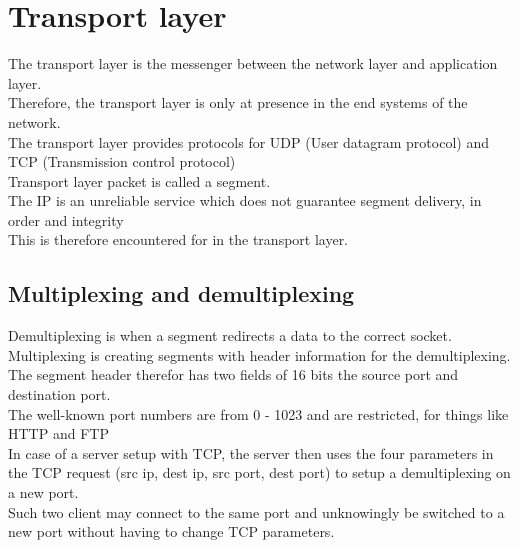 \documentclass[12pt, a4paper]{article}
\begin{document}
	\section{Transport layer}
		The transport layer is the messenger between the network layer and application layer.\\
		Therefore, the transport layer is only at presence in the end systems of the network.\\
		The transport layer provides protocols for UDP (User datagram protocol) and TCP (Transmission control protocol)\\
		Transport layer packet is called a segment.\\
		The IP is an unreliable service which does not guarantee segment delivery, in order and integrity\\
		This is therefore encountered for in the transport layer.\\
		\subsection{Multiplexing and demultiplexing}
			Demultiplexing is when a segment redirects a data to the correct socket.\\
			Multiplexing is creating segments with header information for the demultiplexing.\\
			The segment header therefor has two fields of 16 bits the source port and destination port.\\
			The well-known port numbers are from 0 - 1023 and are restricted, for things like HTTP and FTP\\
			In case of a server setup with TCP, the server then uses the four parameters in the TCP request (src ip, dest ip, src port, dest port) to setup a demultiplexing on a new port.\\
			Such two client may connect to the same port and unknowingly be switched to a new port without having to change TCP parameters.
\end{document}
